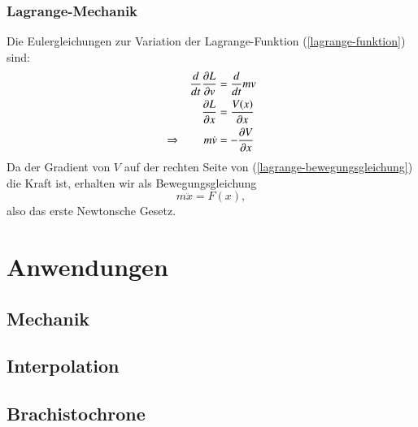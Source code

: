 \subsubsection{Lagrange-Mechanik}
Die Eulergleichungen zur Variation der Lagrange-Funktion
(\ref{lagrange-funktion}) sind:
\begin{align}
\frac{d}{dt}\frac{\partial L}{\partial v}&=\frac{d}{dt}mv
\notag
\\
\frac{\partial L}{\partial x}&=\frac{V(x)}{\partial x}
\notag
\\
\Rightarrow\qquad
m\dot v&=-\frac{\partial V}{\partial x}
\label{lagrange-bewegungsgleichung}
\end{align}
Da der Gradient von $V$ auf der rechten Seite von
(\ref{lagrange-bewegungsgleichung}) die Kraft ist, erhalten wir als
Bewegungsgleichung
\begin{equation}
m\ddot x=F(x),
\end{equation}
also das erste Newtonsche Gesetz.


\section{Anwendungen}
\subsection{Mechanik}
\subsection{Interpolation}
\subsection{Brachistochrone}

